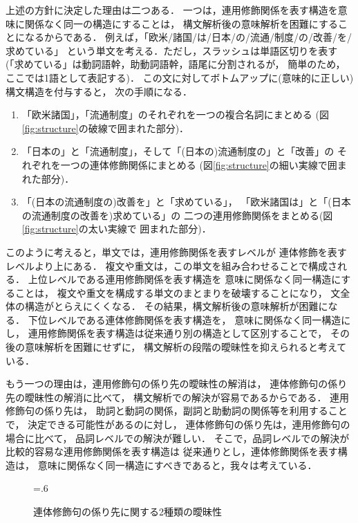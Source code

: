 上述の方針に決定した理由は二つある．
一つは，連用修飾関係を表す構造を意味に関係なく同一の構造にすることは，
構文解析後の意味解析を困難にすることになるからである．
例えば，「欧米/諸国/は/日本/の/流通/制度/の/改善/を/求めている」
という単文を考える．ただし，スラッシュは単語区切りを表す
(「求めている」は動詞語幹，助動詞語幹，語尾に分割されるが，
簡単のため，ここでは1語として表記する)．
この文に対してボトムアップに(意味的に正しい)構文構造を付与すると，
次の手順になる．
\begin{enumerate}
\item 「欧米諸国」，「流通制度」のそれぞれを一つの複合名詞にまとめる
  (図\ref{fig:structure}の破線で囲まれた部分)．
\item 「日本の」と「流通制度」，そして「(日本の)流通制度の」と「改善」の
  それぞれを一つの連体修飾関係にまとめる
  (図\ref{fig:structure}の細い実線で囲まれた部分)．
\item 「(日本の流通制度の)改善を」と「求めている」，
  「欧米諸国は」と「(日本の流通制度の改善を)求めている」の
  二つの連用修飾関係をまとめる(図\ref{fig:structure}の太い実線で
  囲まれた部分)．
\end{enumerate}
このように考えると，単文では，連用修飾関係を表すレベルが
連体修飾を表すレベルより上にある．
複文や重文は，この単文を組み合わせることで構成される．
上位レベルである連用修飾関係を表す構造を
意味に関係なく同一構造にすることは，
複文や重文を構成する単文のまとまりを破壊することになり，
文全体の構造がとらえにくくなる．
その結果，構文解析後の意味解析が困難になる．
下位レベルである連体修飾関係を表す構造を，
意味に関係なく同一構造にし，
連用修飾関係を表す構造は従来通り別の構造として区別することで，
その後の意味解析を困難にせずに，
構文解析の段階の曖昧性を抑えられると考えている．





もう一つの理由は，連用修飾句の係り先の曖昧性の解消は，
連体修飾句の係り先の曖昧性の解消に比べて，
構文解析での解決が容易であるからである．
連用修飾句の係り先は，
助詞と動詞の関係，副詞と助動詞の関係等を利用することで，
決定できる可能性があるのに対し，
連体修飾句の係り先は，連用修飾句の場合に比べて，
品詞レベルでの解決が難しい．
そこで，品詞レベルでの解決が比較的容易な連用修飾関係を表す構造は
従来通りとし，連体修飾関係を表す構造は，
意味に関係なく同一構造にすべきであると，我々は考えている．

\begin{figure}[tp]
  \centering
  \epsfxsize=.6\textwidth
  \caption{連体修飾句の係り先に関する2種類の曖昧性}
  \label{fig:adnominal_phrase}
\end{figure}

